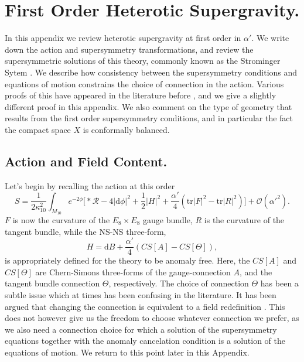 \documentclass[12pt,a4paper]{article}
\def\a{\alpha'}
\def\d{\textrm{d}}
\def\tr{\textrm{tr}}
\def\OO{\mathcal{O}}
\theoremstyle{definition}
\begin{document}
\section{First Order Heterotic Supergravity.}
\label{sec:FirstOrder}
In this appendix we review heterotic supergravity at first order in $\a$. We write down the action and supersymmetry transformations, and review the supersymmetric solutions of this theory, commonly known as the Strominger Sytem \cite{Strominger:1986uh, Hull:1986kz}. We describe how consistency between the supersymmetry conditions and equations of motion constrains the choice of connection in the action. Various proofs of this have appeared in the literature before \cite{Hull:1986kz, Bergshoeff:1988nn, Ivanov:2009rh, Martelli:2010jx}, and we give a slightly different proof in this appendix. We also comment on the type of geometry that results from the first order supersymmetry conditions, and in particular the fact the compact space $X$ is conformally balanced.

\subsection{Action and Field Content.}
Let's begin by recalling the action at this order \cite{Bergshoeff1989439}
\begin{equation}
\label{eq:action}
S=\frac{1}{2\kappa_{10}^2}\int_{M_{10}}e^{-2\phi}\Big[*\mathcal{R}-4\vert\d\phi\vert^2+\frac{1}{2}\vert H\vert^2+\frac{\alpha'}{4}(\tr\vert F\vert^2-\tr\vert R\vert^2)\Big]+\OO(\a^2).
\end{equation}
$F$ is now the curvature of the $E_8{\times}E_8$ gauge bundle, $R$ is the curvature of the tangent bundle, while the NS-NS three-form,
\begin{equation}
\label{eq:anomalycancellation}
H=\d B+\frac{\a}{4}(CS[A]- CS[\Theta]),
\end{equation}
is appropriately defined for the theory to be anomaly free. Here, the $CS[A]$ and $CS[\Theta]$ are Chern-Simons three-forms of the gauge-connection $A$, and the tangent bundle connection $\Theta$, respectively. The choice of connection $\Theta$ has been a subtle issue which at times has been confusing in the literature. It has been argued that changing the connection is equivalent to a field redefinition \cite{Sen1986289}. This does not however give us the freedom to choose whatever connection we prefer, as we also need a connection choice for which a solution of the supersymmetry equations together with the anomaly cancelation condition is a solution of the equations of motion. 
We return to this point later in this Appendix.
\end{document}
